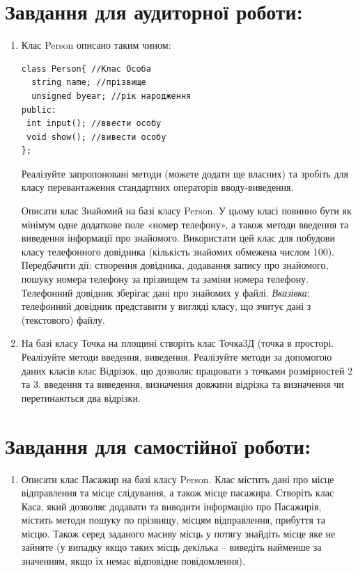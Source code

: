 \documentclass[a5paper,titlepage,openany,twoside,
]
{book_unv}%
\begin{document}
\begin{enumerate}
\begin{enumerate}
\section{Завдання для аудиторної роботи:}

\begin{enumerate}
\def\labelenumi{\arabic{enumi})}

\item
Клас Person описано таким чином:
\begin{verbatim}
class Person{ //Клас Особа
  string name; //прізвище
  unsigned byear; //рік народження
public:
 int input(); //ввести особу  
 void show(); //вивести особу
};
\end{verbatim}

Реалізуйте запропоновані методи (можете додати ще власних) та зробіть
для класу перевантаження стандартних операторів вводу-виведення.

Описати клас Знайомий на базі класу Person. У цьому класі повинно бути 
як мінімум одне додаткове поле «номер телефону»,
 а також методи введення та виведення інформації про знайомого. 
Використати цей клас для побудови класу телефонного довідника (кількість
знайомих обмежена числом 100). Передбачити дії: створення довідника, додавання запису про знайомого,
пошуку номера телефону за прізвищем та заміни номера телефону. 
Телефонний довідник зберігає дані про знайомих у файлі.
\emph{\emph{Вказівка}}: телефонний довідник представити у вигляді класу,
що зчитує дані з (текстового) файлу.

\item
  На базі класу Точка на площині створіть клас Точка3Д (точка
  в просторі. Реалізуйте методи введення, виведення.
  Реалізуйте методи за допомогою даних класів клас Відрізок,
  що дозволяє працювати з точками розмірностей 2 та 3. 
  введення та виведення, визначення довжини відрізка та
  визначення чи перетинаються два відрізки.
\end{enumerate}

\section{Завдання для самостійної роботи:}

\begin{enumerate}
\def\labelenumi{\arabic{enumi})}
\setcounter{enumi}{2}
\item
  Описати клас Пасажир на базі класу Person. Клас містить дані про місце
  відправлення та місце слідування, а також місце пасажира. Створіть
  клас Каса, який дозволяє додавати та виводити інформацію про
  Пасажирів, містить методи пошуку по прізвищу, місцям відправлення,
  прибуття та місцю. Також серед заданого масиву місць у потягу знайдіть
  місце яке не зайняте (у випадку якщо таких місць декілька -- виведіть
  найменше за значенням, якщо їх немає відповідне повідомлення).


\end{enumerate}
\end{enumerate}
\end{enumerate}
\end{document}
